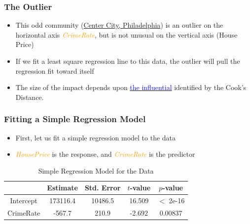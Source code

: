 \documentclass[compress]{beamer}
\begin{document}
\begin{frame}
\frametitle{\sc The Outlier}
	\begin{itemize}
		\item This odd community (\underline{Center City, Philadelphia})  is an outlier on the horizontal axis \textcolor{orange}{\textit{CrimeRate}}, but is not unusual on the vertical axis (House Price)
		\item If we fit a least square regression line to this data, the outlier will pull the regression fit toward itself
		
		\item The size of the impact depends upon \underline{\textcolor{blue}{the influential}} identified by the Cook's Distance.
		    \end{itemize}		
\end{frame}


\begin{frame}
\frametitle{\sc Fitting a Simple Regression Model}
	\begin{itemize}
		\item First, let us fit a simple regression model to the data
		\item \textcolor{orange}{\textit{HousePrice}} is the response, and \textcolor{orange}{\textit{CrimeRate}} is the predictor
	\end{itemize}
    \begin{table}[hptb]
	\scriptsize
	\caption{\small Simple Regression Model for the Data}
	\begin{center}
		\begin{tabular}{ c c c c c} 
			\toprule
			& Estimate & Std. Error & $t$-value & $p$-value \\
			\midrule
			Intercept & 173116.4 & 10486.5 &  16.509  & $<$ 2e-16 \\
			CrimeRate & -567.7   & 210.9   &  -2.692  & 0.00837 \\ 
			\bottomrule
		\end{tabular}
		\end{center}
\end{table}
\end{frame}
\end{document}
